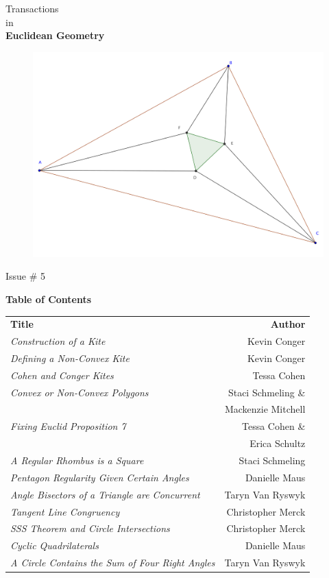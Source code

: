 \documentclass{report}
\begin{document}
\thispagestyle{empty}
\begin{center}
{\Huge Transactions\\ in\\[.2in] \textbf{Euclidean Geometry}}
\vspace{1in}

\begin{figure}[h!]
\includegraphics[width=1.1\textwidth]{cover-image.png}
\end{figure}

\vspace{1in}

{\Huge Issue \# 5}
\end{center}

\clearpage

\center \Large \textbf{Table of Contents}\\[.5in]
\normalsize
\begin{tabular}{lr}
\textbf{Title} & \textbf{Author}\\[.25in]
\emph{Construction of a Kite} & Kevin Conger \\[.25in]
\emph{Defining a Non-Convex Kite} & Kevin Conger \\[.25in]
\emph{Cohen and Conger Kites} & Tessa Cohen \\[.25in]
\emph{Convex or Non-Convex Polygons} & Staci Schmeling \& \\
				& Mackenzie Mitchell \\[.25in]
\emph{Fixing Euclid Proposition 7} & Tessa Cohen \& \\
									& Erica Schultz \\[.25in]
\emph{A Regular Rhombus is a Square} & Staci Schmeling \\[.25in]
\emph{Pentagon Regularity Given Certain Angles} & Danielle Maus \\[.25in]
\emph{Angle Bisectors of a Triangle are Concurrent} & Taryn Van Ryswyk \\[.25in]
\emph{Tangent Line Congruency} & Christopher Merck\\[.25in]
\emph{SSS Theorem and Circle Intersections} & Christopher Merck\\[.25in]
\emph{Cyclic Quadrilaterals} & Danielle Maus \\[.25in]
\emph{A Circle Contains the Sum of Four Right Angles} & Taryn Van Ryswyk \\
\end{tabular}
\end{document}

